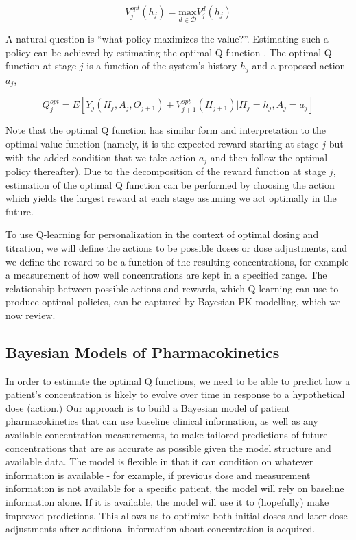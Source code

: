 \begin{equation}
V^{opt}_j(h_j) = \underset{d \in \mathscr{D}}{\mbox{max}} V^d_j(h_j)
\end{equation}

\noindent A natural question is “what policy maximizes the value?”. Estimating such a policy can be achieved by estimating the optimal Q function \cite{chakraborty2013statistical}.  The optimal Q function at stage $ j $ is a function of the system’s history $ h_j $ and a proposed action $ a_j $,

\begin{equation}
 Q_j^{opt} = E \left[ 
 Y_j(H_j, A_j, O_{j+1}) + V^{opt}_{j+1}(H_{j+1}) \lvert H_j = h_j, A_j = a_j
 \right]
\end{equation}

Note that the optimal Q function has similar form and interpretation to the optimal value function (namely, it is the expected reward starting at stage $ j $ but with the added condition that we take action $ a_j $ and then follow the optimal policy thereafter). Due to the decomposition of the reward function at stage $ j $, estimation of the optimal Q function can be performed by choosing the action which yields the largest reward at each stage assuming we act optimally in the future. 

To use Q-learning for personalization in the context of optimal dosing and titration, we will define the actions to be possible doses or dose adjustments, and we define the reward to be a function of the resulting concentrations, for example a measurement of how well concentrations are kept in a specified range. The relationship between possible actions and rewards, which Q-learning can use to produce optimal policies, can be captured by Bayesian PK modelling, which we now review.

\subsection{Bayesian Models of Pharmacokinetics}

In order to estimate the optimal Q functions, we need to be able to predict how a patient's concentration is likely to evolve over time in response to a hypothetical dose (action.)  Our approach is to build a Bayesian model of patient pharmacokinetics that can use baseline clinical information, as well as any available concentration measurements, to make tailored predictions of future concentrations that are as accurate as possible given the model structure and available data. The model is flexible in that it can condition on whatever information is available - for example, if previous dose and measurement information is not available for a specific patient, the model will rely on baseline information alone. If it is available, the model will use it to (hopefully) make improved predictions. This allows us to optimize both initial doses and later dose adjustments after additional information about concentration is acquired.

